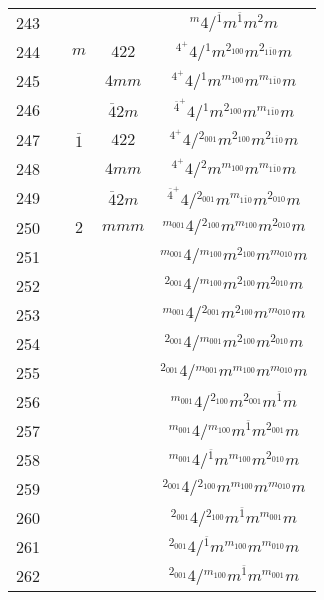 \begin{longtable}{ccccc}
  243 &  &  &  & ${}^{m} 4  / {}^{\overline{1}} m {}^{\overline{1}} m {}^{2} m $\\
  244 &  & $m$ & $422$ & ${}^{4^{+}} 4  / {}^{1} m {}^{2_{100}} m {}^{2_{1\overline{1}0}} m $\\
  245 &  &  & $4mm$ & ${}^{4^{+}} 4  / {}^{1} m {}^{m_{100}} m {}^{m_{1\overline{1}0}} m $\\
  246 &  &  & $\overline{4}2m$ & ${}^{\overline{4}^{+}} 4  / {}^{1} m {}^{2_{100}} m {}^{m_{1\overline{1}0}} m $\\
  247 &  & $\overline{1}$ & $422$ & ${}^{4^{+}} 4  / {}^{2_{001}} m {}^{2_{100}} m {}^{2_{1\overline{1}0}} m $\\
  248 &  &  & $4mm$ & ${}^{4^{+}} 4  / {}^{2} m {}^{m_{100}} m {}^{m_{1\overline{1}0}} m $\\
  249 &  &  & $\overline{4}2m$ & ${}^{\overline{4}^{+}} 4  / {}^{2_{001}} m {}^{m_{1\overline{1}0}} m {}^{2_{010}} m $\\
  250 &  & $2$ & $mmm$ & ${}^{m_{001}} 4  / {}^{2_{100}} m {}^{m_{100}} m {}^{2_{010}} m $\\
  251 &  &  &  & ${}^{m_{001}} 4  / {}^{m_{100}} m {}^{2_{100}} m {}^{m_{010}} m $\\
  252 &  &  &  & ${}^{2_{001}} 4  / {}^{m_{100}} m {}^{2_{100}} m {}^{2_{010}} m $\\
  253 &  &  &  & ${}^{m_{001}} 4  / {}^{2_{001}} m {}^{2_{100}} m {}^{m_{010}} m $\\
  254 &  &  &  & ${}^{2_{001}} 4  / {}^{m_{001}} m {}^{2_{100}} m {}^{2_{010}} m $\\
  255 &  &  &  & ${}^{2_{001}} 4  / {}^{m_{001}} m {}^{m_{100}} m {}^{m_{010}} m $\\
  256 &  &  &  & ${}^{m_{001}} 4  / {}^{2_{100}} m {}^{2_{001}} m {}^{\overline{1}} m $\\
  257 &  &  &  & ${}^{m_{001}} 4  / {}^{m_{100}} m {}^{\overline{1}} m {}^{2_{001}} m $\\
  258 &  &  &  & ${}^{m_{001}} 4  / {}^{\overline{1}} m {}^{m_{100}} m {}^{2_{010}} m $\\
  259 &  &  &  & ${}^{2_{001}} 4  / {}^{2_{100}} m {}^{m_{100}} m {}^{m_{010}} m $\\
  260 &  &  &  & ${}^{2_{001}} 4  / {}^{2_{100}} m {}^{\overline{1}} m {}^{m_{001}} m $\\
  261 &  &  &  & ${}^{2_{001}} 4  / {}^{\overline{1}} m {}^{m_{100}} m {}^{m_{010}} m $\\
  262 &  &  &  & ${}^{2_{001}} 4  / {}^{m_{100}} m {}^{\overline{1}} m {}^{m_{001}} m $\\

\end{longtable}
